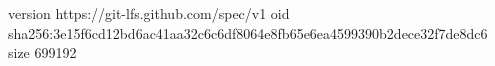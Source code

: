 version https://git-lfs.github.com/spec/v1
oid sha256:3e15f6cd12bd6ac41aa32c6c6df8064e8fb65e6ea4599390b2dece32f7de8dc6
size 699192
